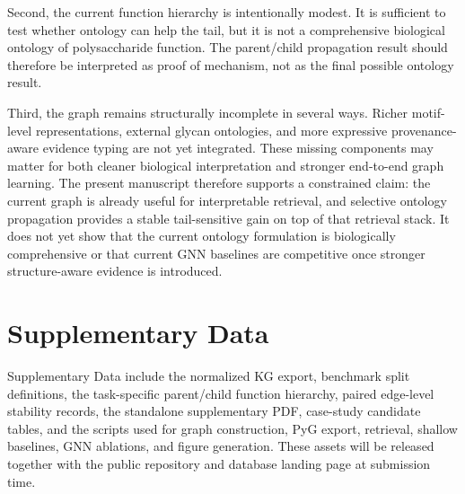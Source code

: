\documentclass[11pt]{article}
\begin{document}
Second, the current function hierarchy is intentionally modest. It is sufficient to test whether ontology can help the tail, but it is not a comprehensive biological ontology of polysaccharide function. The parent/child propagation result should therefore be interpreted as proof of mechanism, not as the final possible ontology result.

Third, the graph remains structurally incomplete in several ways. Richer motif-level representations, external glycan ontologies, and more expressive provenance-aware evidence typing are not yet integrated. These missing components may matter for both cleaner biological interpretation and stronger end-to-end graph learning. The present manuscript therefore supports a constrained claim: the current graph is already useful for interpretable retrieval, and selective ontology propagation provides a stable tail-sensitive gain on top of that retrieval stack. It does not yet show that the current ontology formulation is biologically comprehensive or that current GNN baselines are competitive once stronger structure-aware evidence is introduced.

\section{Supplementary Data}
\label{sec:artifact-availability}

Supplementary Data include the normalized KG export, benchmark split definitions, the task-specific parent/child function hierarchy, paired edge-level stability records, the standalone supplementary PDF, case-study candidate tables, and the scripts used for graph construction, PyG export, retrieval, shallow baselines, GNN ablations, and figure generation. These assets will be released together with the public repository and database landing page at submission time.
\end{document}
